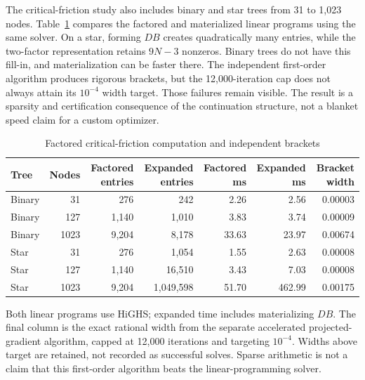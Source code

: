 \documentclass[11pt,letterpaper]{article}
\theoremstyle{definition}
\newcommand{\1}{\mathbf 1}
\begin{document}
The critical-friction study also includes binary and star trees from 31 to 1,023 nodes. Table~\ref{tab:r13-scaling} compares the factored and materialized linear programs using the same solver. On a star, forming $DB$ creates quadratically many entries, while the two-factor representation retains $9N-3$ nonzeros. Binary trees do not have this fill-in, and materialization can be faster there. The independent first-order algorithm produces rigorous brackets, but the 12,000-iteration cap does not always attain its $10^{-4}$ width target. Those failures remain visible. The result is a sparsity and certification consequence of the continuation structure, not a blanket speed claim for a custom optimizer.

\begin{table}[t]
\centering\small
\caption{Factored critical-friction computation and independent brackets}\label{tab:r13-scaling}
\begin{tabular}{lrrrrrr}\toprule
Tree & Nodes & Factored entries & Expanded entries & Factored ms & Expanded ms & Bracket width \\\midrule
Binary & 31 & 276 & 242 & 2.26 & 2.56 & 0.00003 \\
Binary & 127 & 1,140 & 1,010 & 3.83 & 3.74 & 0.00009 \\
Binary & 1023 & 9,204 & 8,178 & 33.63 & 23.97 & 0.00674 \\
Star & 31 & 276 & 1,054 & 1.55 & 2.63 & 0.00008 \\
Star & 127 & 1,140 & 16,510 & 3.43 & 7.03 & 0.00008 \\
Star & 1023 & 9,204 & 1,049,598 & 51.70 & 462.99 & 0.00175 \\
\bottomrule\end{tabular}
\par\smallskip\begin{minipage}{.96\textwidth}\footnotesize Both linear programs use HiGHS; expanded time includes materializing $DB$. The final column is the exact rational width from the separate accelerated projected-gradient algorithm, capped at 12,000 iterations and targeting $10^{-4}$. Widths above target are retained, not recorded as successful solves. Sparse arithmetic is not a claim that this first-order algorithm beats the linear-programming solver.\end{minipage}
\end{table}
\end{document}
